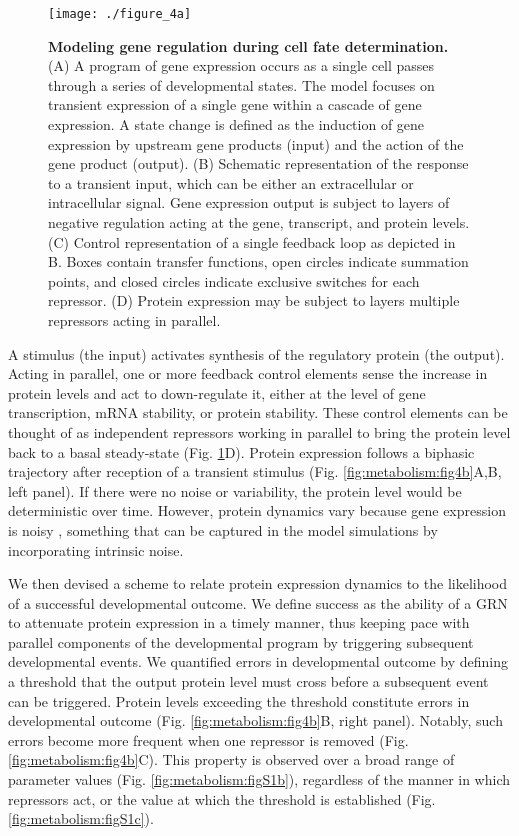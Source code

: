 \begin{figure}[h!]
\centering
\texttt{[image: ./figure\_4a]}
\caption[Modeling gene regulation during cell fate determination.]{\textbf{Modeling gene regulation during cell fate determination.} (A) A program of gene expression occurs as a single cell passes through a series of developmental states. The model focuses on transient expression of a single gene within a cascade of gene expression. A state change is defined as the induction of gene expression by upstream gene products (input) and the action of the gene product (output). (B) Schematic representation of the response to a transient input, which can be either an extracellular or intracellular signal. Gene expression output is subject to layers of negative regulation acting at the gene, transcript, and protein levels. (C) Control representation of a single feedback loop as depicted in B. Boxes contain transfer functions, open circles indicate summation points, and closed circles indicate exclusive switches for each repressor. (D) Protein expression may be subject to layers multiple repressors acting in parallel.}
\label{fig:metabolism:fig4a}
\end{figure}

A stimulus (the input) activates synthesis of the regulatory protein (the output). Acting in parallel, one or more feedback control elements sense the increase in protein levels and act to down-regulate it, either at the level of gene transcription, mRNA stability, or protein stability. These control elements can be thought of as independent repressors working in parallel to bring the protein level back to a basal steady-state (Fig. \ref{fig:metabolism:fig4a}D). Protein expression follows a biphasic trajectory after reception of a transient stimulus (Fig. \ref{fig:metabolism:fig4b}A,B, left panel). If there were no noise or variability, the protein level would be deterministic over time. However, protein dynamics vary because gene expression is noisy \cite{Arias2006}, something that can be captured in the model simulations by incorporating intrinsic noise.

We then devised a scheme to relate protein expression dynamics to the likelihood of a successful developmental outcome. We define success as the ability of a GRN to attenuate protein expression in a timely manner, thus keeping pace with parallel components of the developmental program by triggering subsequent developmental events. We quantified errors in developmental outcome by defining a threshold that the output protein level must cross before a subsequent event can be triggered. Protein levels exceeding the threshold constitute errors in developmental outcome (Fig. \ref{fig:metabolism:fig4b}B, right panel). Notably, such errors become more frequent when one repressor is removed (Fig. \ref{fig:metabolism:fig4b}C). This property is observed over a broad range of parameter values (Fig. \ref{fig:metabolism:figS1b}), regardless of the manner in which repressors act, or the value at which the threshold is established (Fig. \ref{fig:metabolism:figS1c}).

